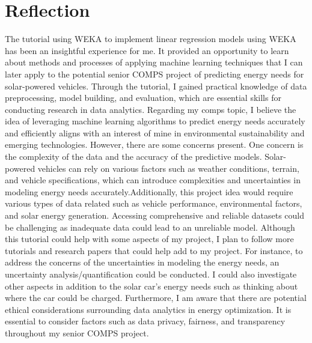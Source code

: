 \documentclass[10pt,twocolumn]{article}
\begin{document}
\section{Reflection }
The tutorial using WEKA to implement linear regression models using WEKA has been an insightful experience for me. It provided an opportunity to learn about methods and processes of applying machine learning techniques that I can later apply to the potential senior COMPS project of  predicting energy needs for solar-powered vehicles. Through the tutorial, I gained practical knowledge of data preprocessing, model building, and evaluation, which are essential skills for conducting research in data analytics.
Regarding my comps topic, I believe the idea of leveraging machine learning algorithms to predict energy needs accurately and efficiently aligns with an interest of mine in environmental sustainability and emerging technologies. However, there are some concerns present. One concern is the complexity of the data and the accuracy of the predictive models. Solar-powered vehicles can rely on various factors such as weather conditions, terrain, and vehicle specifications, which can introduce complexities and uncertainties in modeling energy needs accurately.Additionally, this project idea would require various types of data related such as vehicle performance, environmental factors, and solar energy generation. Accessing comprehensive and reliable datasets could be challenging as inadequate data could lead to an unreliable model.
Although this tutorial could help with some aspects of my project, I plan to follow more tutorials and research papers that could help add to my project. For instance, to address the concerns of the uncertainties in modeling the energy needs, an uncertainty analysis/quantification could be conducted. I could also investigate other aspects in addition to the solar car’s energy needs such as thinking about where the car could be charged. Furthermore, I am aware that there are potential ethical considerations surrounding data analytics in energy optimization. It is essential to consider factors such as data privacy, fairness, and transparency throughout my senior COMPS project. 
\end{document}
